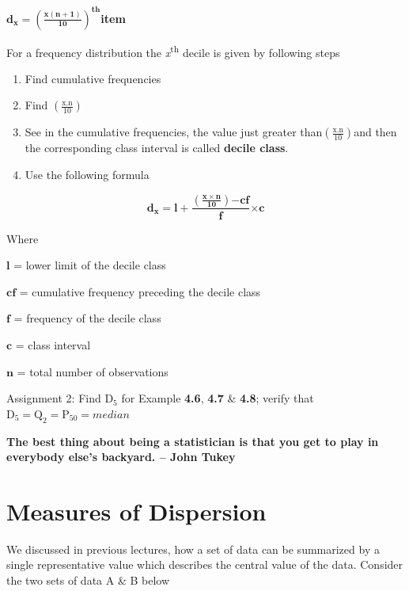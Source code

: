 \documentclass[
]{book}
\makeatletter
\newenvironment{kframe}{%
\medskip{}
\setlength{\fboxsep}{.8em}
 \def\at@end@of@kframe{}%
 \ifinner\ifhmode%
  \def\at@end@of@kframe{\end{minipage}}%
  \begin{minipage}{\columnwidth}%
 \fi\fi%
 \def\FrameCommand##1{\hskip\@totalleftmargin \hskip-\fboxsep
 \colorbox{shadecolor}{##1}\hskip-\fboxsep
     \hskip-\linewidth \hskip-\@totalleftmargin \hskip\columnwidth}%
 \MakeFramed {\advance\hsize-\width
   \@totalleftmargin\z@ \linewidth\hsize
   \@setminipage}}%
 {\par\unskip\endMakeFramed%
 \at@end@of@kframe}
\newenvironment{rmdblock}[1]
  {
  \begin{itemize}
  \renewcommand{\labelitemi}{
    \raisebox{-.7\height}[0pt][0pt]{
      {\setkeys{Gin}{width=3em,keepaspectratio}\texttt{[image: images/\#1]}}
    }
  }
  \setlength{\fboxsep}{1em}
  \begin{kframe}
  \item
  }
  {
  \end{kframe}
  \end{itemize}
  }
\newenvironment{rmdnote}
  {\begin{rmdblock}{note}}
  {\end{rmdblock}}
\makeatother
\begin{document}
\(\mathbf{d}_{\mathbf{x}}\mathbf{=}\left( \frac{\mathbf{x}\left( \mathbf{n + 1} \right)}{\mathbf{10}} \right)^{\mathbf{\text{th}}}\)\textbf{item}

For a frequency distribution the \emph{x}\textsuperscript{th} decile is given by following
steps

\begin{enumerate}
\def\labelenumi{\arabic{enumi}.}
\item
  Find cumulative frequencies
\item
  Find \(\left( \frac{\text{x.n}}{10} \right)\)
\item
  See in the cumulative frequencies, the value just greater
  than\(\left( \frac{\text{x.n}}{10} \right)\)and then the corresponding
  class interval is called \textbf{decile class}.
\item
  Use the following formula
\end{enumerate}

\[\mathbf{d}_{\mathbf{x}}\mathbf{= l +}\frac{\left( \frac{\mathbf{x \times n}}{\mathbf{10}} \right)\mathbf{- cf}}{\mathbf{f}}\mathbf{\times c}\]

Where

\(\mathbf{l}\) = lower limit of the decile class

\(\mathbf{\text{cf}}\) = cumulative frequency preceding the decile class

\(\mathbf{f}\) = frequency of the decile class

\(\mathbf{c}\) = class interval

\(\mathbf{n}\) = total number of observations

\begin{rmdnote}
Assignment 2: Find \(\text{D}_{5}\) for Example \textbf{4.6}, \textbf{4.7} \&
\textbf{4.8}; verify that
\(\text{D}_{5} = \text{Q}_{2} = \text{P}_{50} = median\)
\end{rmdnote}

\hypertarget{hello}{}
\textbf{The best thing about being a statistician is that you get to play in everybody else's backyard.
-- John Tukey}

\hypertarget{measures-of-dispersion}{%
\chapter{Measures of Dispersion}\label{measures-of-dispersion}}

We discussed in previous lectures, how a set of data can be summarized
by a single representative value which describes the central value of
the data. Consider the two sets of data A \& B below
\end{document}
